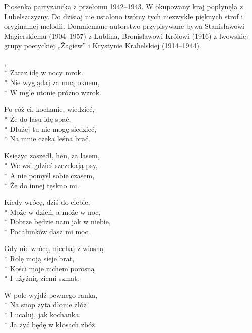 \begin{info}Piosenka partyzancka z przełomu 1942–1943. W okupowany kraj popłynęła z Lubelszczyzny. Do dzisiaj nie ustalono twórcy tych niezwykle pięknych strof i oryginalnej melodii. Domniemane autorstwo przypisywane bywa Stanisławowi Magierskiemu (1904–1957) z Lublina, Bronisławowi Królowi (1916) z lwowskiej grupy poetyckiej „Żagiew” i Krystynie Krahelskiej (1914–1944).\end{info}

\begin{lyrics}[longestline={Dziś do ciebie przyjść nie mogę,}]

,\\*
Zaraz idę w nocy mrok.\\*
Nie wyglądaj za mną oknem,\\*
W mgle utonie próżno wzrok.

Po cóż ci, kochanie, wiedzieć,\\*
Że do lasu idę spać,\\*
Dłużej tu nie mogę siedzieć,\\*
Na mnie czeka leśna brać.

Księżyc zaszedł, hen, za lasem,\\*
We wsi gdzieś szczekają psy,\\*
A nie pomyśl sobie czasem,\\*
Że do innej tęskno mi.

Kiedy wrócę, dziś do ciebie,\\*
Może w dzień, a może w noc,\\*
Dobrze będzie nam jak w niebie,\\*
Pocałunków dasz mi moc.

Gdy nie wrócę, niechaj z wiosną\\*
Rolę moją sieje brat,\\*
Kości moje mchem porosną\\*
I użyźnią ziemi szmat.

W pole wyjdź pewnego ranka,\\*
Na snop żyta dłonie złóż\\*
I ucałuj, jak kochanka.\\*
Ja żyć będę w kłosach zbóż.
\end{lyrics}



